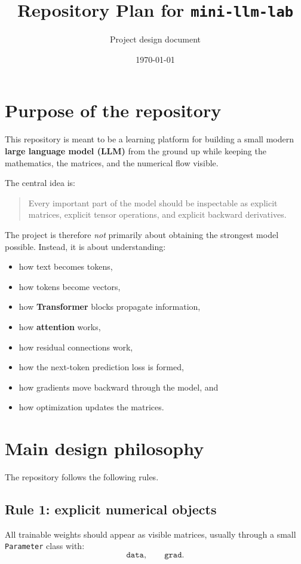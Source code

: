 \documentclass[11pt]{article}
\title{Repository Plan for \texttt{mini-llm-lab}}
\author{Project design document}
\date{\today}
\begin{document}
\maketitle

\section{Purpose of the repository}

This repository is meant to be a learning platform for building a small modern
\textbf{large language model (LLM)} from the ground up while keeping the mathematics,
the matrices, and the numerical flow visible.

The central idea is:

\begin{quote}
Every important part of the model should be inspectable as explicit matrices,
explicit tensor operations, and explicit backward derivatives.
\end{quote}

The project is therefore \emph{not} primarily about obtaining the strongest model
possible. Instead, it is about understanding:

\begin{itemize}[leftmargin=1.5em]
    \item how text becomes tokens,
    \item how tokens become vectors,
    \item how \textbf{Transformer} blocks propagate information,
    \item how \textbf{attention} works,
    \item how residual connections work,
    \item how the next-token prediction loss is formed,
    \item how gradients move backward through the model, and
    \item how optimization updates the matrices.
\end{itemize}

\section{Main design philosophy}

The repository follows the following rules.

\subsection*{Rule 1: explicit numerical objects}
All trainable weights should appear as visible matrices, usually through a small
\texttt{Parameter} class with:
\[
\texttt{data}, \qquad \texttt{grad}.
\]
\end{document}
